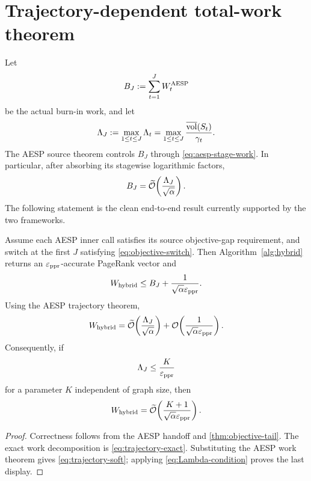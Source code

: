 \section{Trajectory-dependent total-work theorem}
\label{sec:trajectory}

Let
\begin{equation}
  B_J:=\sum_{t=1}^J W_t^{\rm AESP}
  \label{eq:BJ}
\end{equation}
be the actual burn-in work, and let
\begin{equation}
  \Lambda_J:=\max_{1\leq t\leq J}\Lambda_t
  =\max_{1\leq t\leq J}
    \frac{\overline{\operatorname{vol}}(S_t)}{\gamma_t}.
  \label{eq:Lambda-J}
\end{equation}
The AESP source theorem controls $B_J$ through \cref{eq:aesp-stage-work}.  In
particular, after absorbing its stagewise logarithmic factors,
\begin{equation}
  B_J
  =\widetilde{\mathcal{O}}\!\left(\frac{\Lambda_J}{\sqrt\alpha}\right).
  \label{eq:BJ-soft}
\end{equation}
The following statement is the clean end-to-end result currently supported by
the two frameworks.

\begin{theorem}
\label{thm:trajectory}
Assume each AESP inner call satisfies its source objective-gap requirement,
and switch at the first $J$ satisfying \cref{eq:objective-switch}.  Then
Algorithm~\ref{alg:hybrid} returns an $\varepsilon_{\mathrm{ppr}}$-accurate PageRank vector and
\begin{equation}
  W_{\rm hybrid}
  \leq
  B_J+\frac1{\sqrt\alpha\varepsilon_{\mathrm{ppr}}}.
  \label{eq:trajectory-exact}
\end{equation}
Using the AESP trajectory theorem,
\begin{equation}
  W_{\rm hybrid}
  =\widetilde{\mathcal{O}}\!\left(\frac{\Lambda_J}{\sqrt\alpha}\right)
   +\mathcal{O}\!\left(\frac1{\sqrt\alpha\varepsilon_{\mathrm{ppr}}}\right).
  \label{eq:trajectory-soft}
\end{equation}
Consequently, if
\begin{equation}
  \Lambda_J\leq\frac{K}{\varepsilon_{\mathrm{ppr}}}
  \label{eq:Lambda-condition}
\end{equation}
for a parameter $K$ independent of graph size, then
\begin{equation}
  W_{\rm hybrid}
  =\widetilde{\mathcal{O}}\!\left(\frac{K+1}{\sqrt\alpha\varepsilon_{\mathrm{ppr}}}\right).
  \label{eq:conditional-total}
\end{equation}
\end{theorem}

\begin{proof}
Correctness follows from the AESP handoff and
\cref{thm:objective-tail}.  The exact work decomposition is
\cref{eq:trajectory-exact}.  Substituting the AESP work theorem gives
\cref{eq:trajectory-soft}; applying \cref{eq:Lambda-condition} proves the
last display.
\end{proof}

